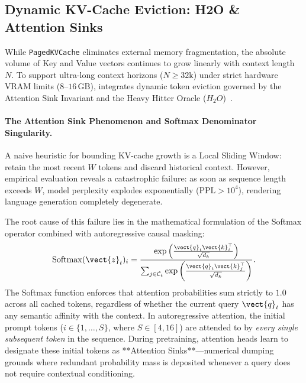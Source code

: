 \subsection{Dynamic KV-Cache Eviction: H2O \& Attention Sinks}
\label{sec:serving_eviction_policies}

While \texttt{PagedKVCache} eliminates external memory fragmentation, the absolute volume of Key and Value vectors continues to grow linearly with context length $N$. To support ultra-long context horizons ($N \ge 32\text{k}$) under strict hardware VRAM limits ($8\text{--}16\,\text{GB}$), \neuralops{} integrates dynamic token eviction governed by the Attention Sink Invariant and the Heavy Hitter Oracle ($H_2O$)~\cite{zhang2024h2o,xiao2024streamingllm}.

\paragraph{The Attention Sink Phenomenon and Softmax Denominator Singularity.}
A naive heuristic for bounding KV-cache growth is a Local Sliding Window: retain the most recent $W$ tokens and discard historical context. However, empirical evaluation reveals a catastrophic failure: as soon as sequence length exceeds $W$, model perplexity explodes exponentially ($\text{PPL} > 10^4$), rendering language generation completely degenerate.

The root cause of this failure lies in the mathematical formulation of the Softmax operator combined with autoregressive causal masking:
\begin{equation}
\operatorname{Softmax}(\vect{z}_t)_i = \frac{\exp\left( \frac{\vect{q}_t \vect{k}_i^\top}{\sqrt{d_k}} \right)}{\sum_{j \in \mathcal{C}_t} \exp\left( \frac{\vect{q}_t \vect{k}_j^\top}{\sqrt{d_k}} \right)}.
\end{equation}
The Softmax function enforces that attention probabilities sum strictly to $1.0$ across all cached tokens, regardless of whether the current query $\vect{q}_t$ has any semantic affinity with the context. In autoregressive attention, the initial prompt tokens ($i \in \{1, \dots, S\}$, where $S \in [4, 16]$) are attended to by \emph{every single subsequent token} in the sequence. During pretraining, attention heads learn to designate these initial tokens as **Attention Sinks**—numerical dumping grounds where redundant probability mass is deposited whenever a query does not require contextual conditioning.

